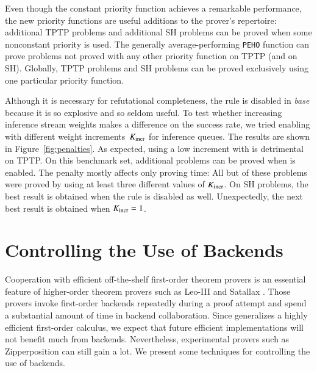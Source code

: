 Even though the constant priority function achieves a remarkable performance, the new priority functions are
useful additions to the prover's repertoire:  additional
TPTP problems and  additional SH problems can be proved when some
nonconstant priority is used. The generally average-performing \verb|PEHO|
function can prove  problems not proved with any other priority function on TPTP
(and  on SH). Globally,  TPTP problems and  SH problems
can be proved exclusively using one particular priority function.


Although it is necessary for refutational completeness, the 
rule is disabled in \emph{base} because it is so explosive and so seldom useful.
To test whether increasing inference stream weights makes a difference on the
success rate, we tried enabling  with different weight
increments~$K_\mathrm{incr}$ for  inference queues. The
results are shown in Figure~\ref{fig:penalties}. As expected, using a low
increment with  is detrimental on TPTP. On this
benchmark set,  additional problems can be proved when
 is enabled. The penalty mostly affects only proving time: All
but  of these problems were proved by using at least three different
values of $K_\mathrm{incr}$. On SH problems, the best result is obtained
when the rule is disabled as well. Unexpectedly, the next best result is obtained when
$K_\mathrm{incr}=1$.

\section{Controlling the Use of Backends}
\label{sec:ho-tech:backends}

\newcommand{\ParamNumClauses}{\ensuremath{K_\mathrm{size}}}
\newcommand{\ParamTime}{\ensuremath{K_\mathrm{time}}}

Cooperation with efficient off-the-shelf first-order theorem provers is an
essential feature of higher-order theorem provers such as Leo-III
\cite[Sect.~4.4]{as-18-phd} and Satallax \cite{cb-12-satallax}.
Those provers invoke first-order backends repeatedly
during a proof attempt and spend a substantial amount of time in backend
collaboration. Since \lsup{} generalizes a highly efficient
first-order calculus, we expect that future efficient \lsup{}
implementations will not benefit much from backends.
Nevertheless, experimental provers such
as Zipperposition can still gain a lot. We present some
techniques for controlling the use of backends.

